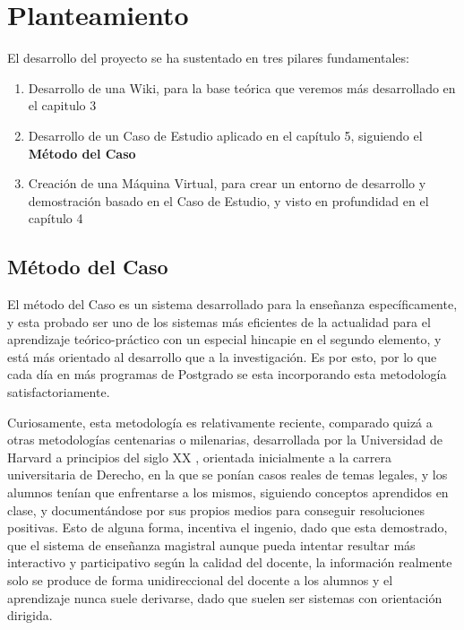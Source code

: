 
\section{Planteamiento}

El desarrollo del proyecto se ha sustentado en tres pilares fundamentales:

\begin{enumerate}
	\item Desarrollo de una Wiki, para la base teórica que veremos más desarrollado en el capitulo 3
	\item Desarrollo de un Caso de Estudio aplicado en el capítulo 5, siguiendo el \textbf{Método del Caso}
	\item Creación de una Máquina Virtual, para crear un entorno de desarrollo y demostración basado en el Caso de Estudio, y visto en profundidad en el capítulo 4
\end{enumerate}

\subsection{Método del Caso}

El método del Caso es un sistema desarrollado para la enseñanza específicamente, y esta probado ser uno de los sistemas más eficientes de la actualidad para el aprendizaje teórico-práctico con un especial hincapie en el segundo elemento, y está más orientado al desarrollo que a la investigación. Es por esto, por lo que cada día en más programas de Postgrado se esta incorporando esta metodología satisfactoriamente.

Curiosamente, esta metodología es relativamente reciente, comparado quizá a otras metodologías centenarias o milenarias, desarrollada por la Universidad de Harvard\cite{website:hbsp} a principios del siglo XX \cite{website:voipinfo}, orientada inicialmente a la carrera universitaria de Derecho, en la que se ponían casos reales de temas legales, y los alumnos tenían que enfrentarse a los mismos, siguiendo conceptos aprendidos en clase, y documentándose por sus propios medios para conseguir resoluciones positivas. Esto de alguna forma, incentiva el ingenio, dado que esta demostrado, que el sistema de enseñanza magistral aunque pueda intentar resultar más interactivo y participativo según la calidad del docente, la información realmente solo se produce de forma unidireccional del docente a los alumnos y el aprendizaje nunca suele derivarse, dado que suelen ser sistemas con orientación dirigida.

